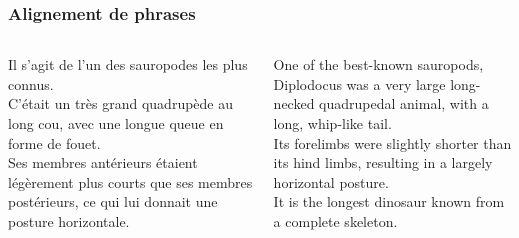 \begin{frame}[shrink=5]
\frametitle{Alignement de phrases}

\vspace*{1em}

\small

\begin{columns}[c] 
    

    Il s'agit de l'un des sauropodes les plus connus. \\[0.5em]

    C'était un très grand quadrupède au long cou, avec une longue queue en 
    forme de fouet.\\[0.5em]

    Ses membres antérieurs étaient légèrement plus courts que ses membres 
    postérieurs, ce qui lui donnait une posture horizontale.\\[1.2em]
    ~


    \vspace*{1em}


    One of the best-known sauropods, Diplodocus was a very large long-necked 
    quadrupedal animal, with a long, whip-like tail.\\[1.2em]

    Its forelimbs were slightly shorter than its hind limbs, resulting in a 
    largely horizontal posture.\\[1.2em]

    It is the longest dinosaur known from a complete skeleton.

\end{columns}

\end{frame}


